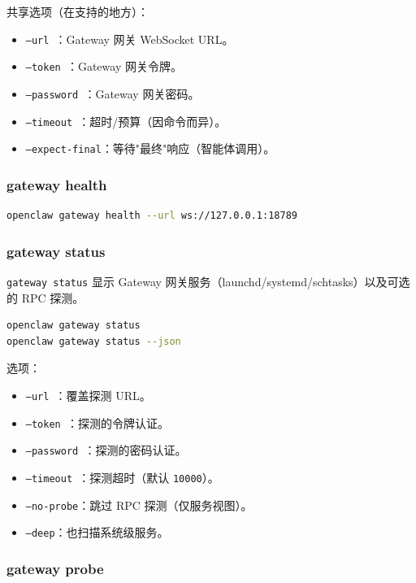 共享选项（在支持的地方）：

\begin{itemize}
  \item \texttt{--url }：Gateway 网关 WebSocket URL。
  \item \texttt{--token }：Gateway 网关令牌。
  \item \texttt{--password }：Gateway 网关密码。
  \item \texttt{--timeout }：超时/预算（因命令而异）。
  \item \texttt{--expect-final}：等待"最终"响应（智能体调用）。
\end{itemize}


\subsubsection{gateway health}


\begin{lstlisting}[language=bash]
openclaw gateway health --url ws://127.0.0.1:18789
\end{lstlisting}


\subsubsection{gateway status}


\texttt{gateway status} 显示 Gateway 网关服务（launchd/systemd/schtasks）以及可选的 RPC 探测。

\begin{lstlisting}[language=bash]
openclaw gateway status
openclaw gateway status --json
\end{lstlisting}


选项：

\begin{itemize}
  \item \texttt{--url }：覆盖探测 URL。
  \item \texttt{--token }：探测的令牌认证。
  \item \texttt{--password }：探测的密码认证。
  \item \texttt{--timeout }：探测超时（默认 \texttt{10000}）。
  \item \texttt{--no-probe}：跳过 RPC 探测（仅服务视图）。
  \item \texttt{--deep}：也扫描系统级服务。
\end{itemize}


\subsubsection{gateway probe}


